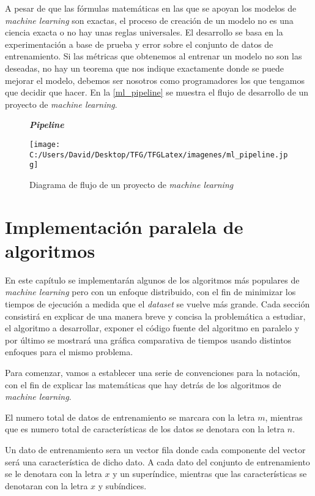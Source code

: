 A pesar de que las fórmulas matemáticas en las que se apoyan los modelos de \textit{machine learning} son
exactas, el proceso de creación de un modelo no es una ciencia exacta o no hay unas reglas universales. 
El desarrollo se basa en la experimentación a base de prueba y error sobre el conjunto de datos de entrenamiento.
Si las métricas que obtenemos al entrenar un modelo no son las deseadas, no hay un teorema que nos indique
exactamente donde se puede mejorar el modelo, debemos ser nosotros como programadores los que tengamos que
decidir que hacer.\hfill \break
En la \autoref{ml_pipeline} se muestra el flujo de desarrollo de un proyecto de \textit{machine learning}.

\begin{figure}[h]
  \centering
  \textbf{\textbf{\textit{Pipeline}}}\par\medskip
  \texttt{[image: C:/Users/David/Desktop/TFG/TFGLatex/imagenes/ml\_pipeline.jpg]}
  \caption[\textit{Machine learning pipeline}]{Diagrama de flujo de un proyecto de \textit{machine learning}}
  \label{ml_pipeline}
\end{figure}

\clearpage


\chapter[Implementación paralela]{Implementación paralela de algoritmos}\label{chap:implementacion_paralela}
En este capítulo se implementarán algunos de los algoritmos más populares de \textit{machine learning} 
pero con un enfoque distribuido, con el fin de minimizar los tiempos de ejecución a medida que
el \textit{dataset} se vuelve más grande.
Cada sección consistirá en explicar de una manera breve y concisa la problemática a estudiar, 
el algoritmo a desarrollar, exponer el código fuente del algoritmo en paralelo y por último se mostrará
una gráfica comparativa de tiempos usando distintos enfoques para el mismo problema.
\newline

Para comenzar, vamos a establecer una serie de convenciones para la notación, con el fin de explicar
las matemáticas que hay detrás de los algoritmos de \textit{machine learning}.

El numero total de datos de entrenamiento se marcara con la letra $m$, mientras que es numero total
de características de los datos se denotara con la letra $n$.

Un dato de entrenamiento sera un vector fila donde cada componente del vector será una característica
de dicho dato. A cada dato del conjunto de entrenamiento se le denotara con la letra $x$ y un 
superíndice, mientras que las características se denotaran con la letra $x$ y subíndices. 

